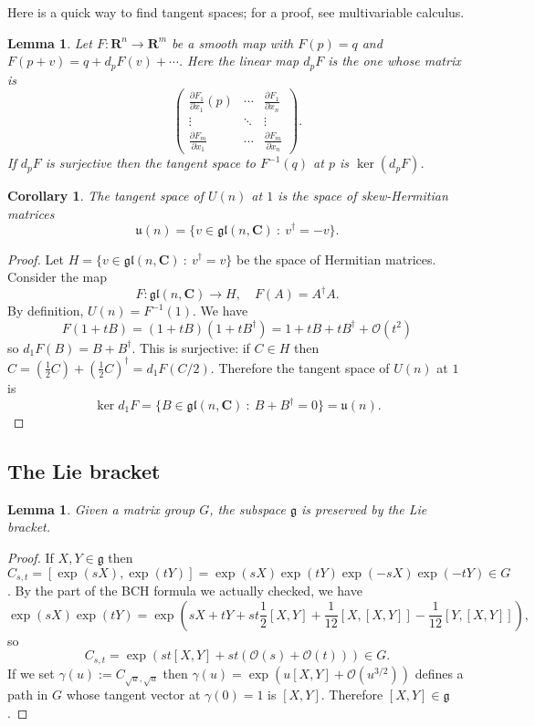 \documentclass[12pt]{article}
\newcommand{\pd}[2]{\frac{\partial #1}{\partial #2}}
\newcommand{\CC}{\mathbf{C}}
\newcommand{\RR}{\mathbf{R}}
\newcommand{\mats}[4]{\left(\begin{array}{ccc}#1 & \cdots & #2\\ \vdots & \ddots & \vdots \\ #3 & \cdots & #4\end{array}\right)}
\newtheorem{lma}[thm]{Lemma}
\newtheorem{cor}[thm]{Corollary}
\theoremstyle{definition}
\theoremstyle{check}
\theoremstyle{remark}
\theoremstyle{TheoremNum}
\begin{document}
Here is a quick way to find tangent spaces; for a proof, see multivariable calculus.

\begin{lma}
Let $F\colon\RR^n\to\RR^m$ be a smooth map with $F(p)=q$ and $F(p+v)=q+d_pF(v)+\cdots$. Here the linear map $d_pF$ is the one whose matrix is
\[\mats{\pd{F_1}{x_1}(p)}{\pd{F_1}{x_n}}{\pd{F_m}{x_1}}{\pd{F_m}{x_n}}.\]
If $d_pF$ is surjective then the tangent space to $F^{-1}(q)$ at $p$ is $\ker(d_pF)$.
\end{lma}

\begin{cor}
The tangent space of $U(n)$ at $1$ is the space of skew-Hermitian matrices
\[\mathfrak{u}(n)=\{v\in\mathfrak{gl}(n,\CC)\ :\ v^{\dagger}=-v\}.\]
\end{cor}
\begin{proof}
Let $H=\{v\in\mathfrak{gl}(n,\CC)\ :\ v^{\dagger}=v\}$ be the space of Hermitian matrices. Consider the map
\[F\colon\mathfrak{gl}(n,\CC)\to H,\quad F(A)=A^{\dagger}A.\]
By definition, $U(n)=F^{-1}(1)$. We have
\[F(1+tB)=(1+tB)(1+tB^{\dagger})=1+tB+tB^{\dagger}+\mathcal{O}(t^2)\]
so $d_1F(B)=B+B^{\dagger}$. This is surjective: if $C\in H$ then $C=\left(\frac{1}{2}C\right)+\left(\frac{1}{2}C\right)^{\dagger}=d_1F(C/2)$. Therefore the tangent space of $U(n)$ at $1$ is
\[\ker d_1F=\{B\in\mathfrak{gl}(n,\CC)\ :\ B+B^{\dagger}=0\}=\mathfrak{u}(n).\]
\end{proof}


\subsection{The Lie bracket}

\begin{lma}\label{lma:liesubalg}
Given a matrix group $G$, the subspace $\mathfrak{g}$ is preserved by the Lie bracket.
\end{lma}
\begin{proof}
If $X,Y\in\mathfrak{g}$ then $C_{s,t}=[\exp(sX),\exp(tY)]=\exp(sX)\exp(tY)\exp(-sX)\exp(-tY)\in G$.
 By the part of the BCH formula we actually checked, we have
\[\exp(sX)\exp(tY)=\exp\left(sX+tY+st\frac{1}{2}[X,Y]+\frac{1}{12}[X,[X,Y]]-\frac{1}{12}[Y,[X,Y]]\right),\]
so 
\[C_{s,t}=\exp(st[X,Y]+st(\mathcal{O}(s)+\mathcal{O}(t)))\in G.\]
If we set $\gamma(u):=C_{\sqrt{u},\sqrt{u}}$ then $\gamma(u)=\exp(u[X,Y]+\mathcal{O}(u^{3/2}))$ defines a path in $G$ whose tangent vector at $\gamma(0)=1$ is $[X,Y]$. Therefore $[X,Y]\in\mathfrak{g}$.
\end{proof}
\end{document}
